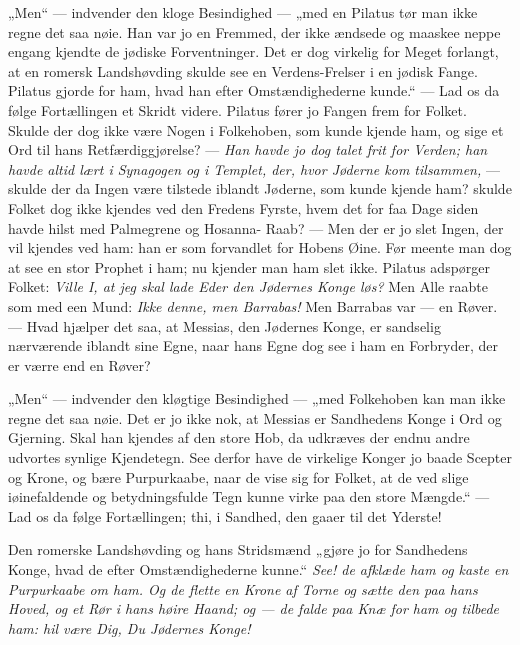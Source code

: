 \documentclass[12pt,a4paper]{book}
\begin{document}
„Men“ --- indvender den kloge Besindighed --- „med en Pilatus tør man ikke regne
det saa nøie. Han var jo en Fremmed, der ikke ændsede og maaskee neppe engang
kjendte de jødiske Forventninger. Det er dog virkelig for Meget forlangt, at en
romersk Landshøvding skulde see en Verdens-Frelser i en jødisk Fange. Pilatus
gjorde for ham, hvad han efter Omstændighederne kunde.“ --- Lad os da følge
Fortællingen et Skridt videre. Pilatus fører jo Fangen frem for Folket. Skulde
der dog ikke være Nogen i Folkehoben, som kunde kjende ham, og sige et Ord til
hans Retfærdiggjørelse? --- \emph{Han havde jo dog talet frit for Verden; han
havde altid lært i Synagogen og i Templet, der, hvor Jøderne kom tilsammen,} ---
skulde der da Ingen være tilstede iblandt Jøderne, som kunde kjende ham? skulde
Folket dog ikke kjendes ved den Fredens Fyrste, hvem det for faa Dage siden havde
hilst med Palmegrene og Hosanna-%
Raab? --- Men der er jo slet Ingen, der vil kjendes ved ham: han er som
forvandlet for Hobens Øine. Før meente man dog at see en stor Prophet i ham; nu
kjender man ham slet ikke. Pilatus adspørger Folket: \emph{Ville I, at jeg skal
lade Eder den Jødernes Konge løs?} Men Alle raabte som med een Mund: \emph{Ikke
denne, men Barrabas!} Men Barrabas var --- en Røver. --- Hvad hjælper det saa, at
Messias, den Jødernes Konge, er sandselig nærværende iblandt sine Egne, naar hans
Egne dog see i ham en Forbryder, der er værre end en Røver?

„Men“ --- indvender den kløgtige Besindighed --- „med Folkehoben kan man ikke
regne det saa nøie. Det er jo ikke nok, at Messias er Sandhedens Konge i Ord og
Gjerning. Skal han kjendes af den store Hob, da udkræves der endnu andre udvortes
synlige Kjendetegn. See derfor have de virkelige Konger jo baade Scepter og
Krone, og bære Purpurkaabe, naar de vise sig for Folket, at de ved slige
iøinefaldende og betydningsfulde Tegn kunne virke paa den store Mængde.“ --- Lad
os da følge Fortællingen; thi, i Sandhed, den gaaer til det Yderste!

Den romerske Landshøvding og hans Stridsmænd „gjøre jo for Sandhedens Konge, hvad
de efter Omstændighederne kunne.“ \emph{See! de afklæde ham og kaste en
Purpurkaabe om ham. Og de flette en Krone af Torne og sætte den paa hans Hoved,
og et Rør i hans høire Haand; og --- de falde paa Knæ for ham og tilbede ham: hil
være Dig, Du Jødernes Konge!}
\end{document}
